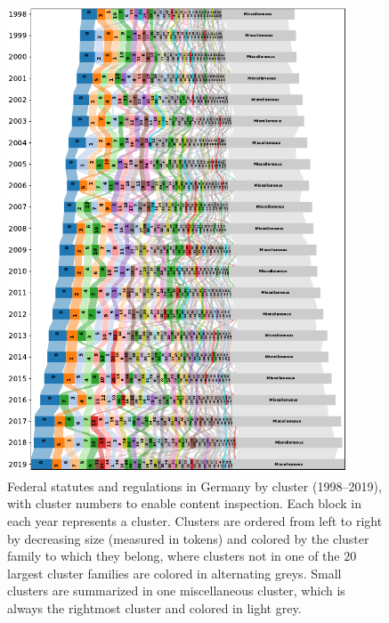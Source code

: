 \documentclass[utf8,sort&compress,numbers,square,table,hidelinks]{frontiers_suppmat} %
\begin{document}
\begin{figure}
	\centering
	\vspace*{-12pt}\includegraphics[width=0.9\textwidth]{figure_si_sankey_de.pdf}
	\caption{%
		Federal statutes and regulations in Germany by cluster (1998--2019), 
		with cluster numbers to enable content inspection. 
		Each block in each year represents a cluster. 
		Clusters are ordered from left to right by decreasing size (measured in tokens) and colored by the cluster family to which they belong, 
		where clusters not in one of the $20$ largest cluster families are colored in alternating greys. 
		Small clusters are summarized in one miscellaneous cluster, which is always the rightmost cluster and colored in light grey.
	}
	\label{fig:sankey-de-labels}
\end{figure}



\vspace*{12pt}
\end{document}
